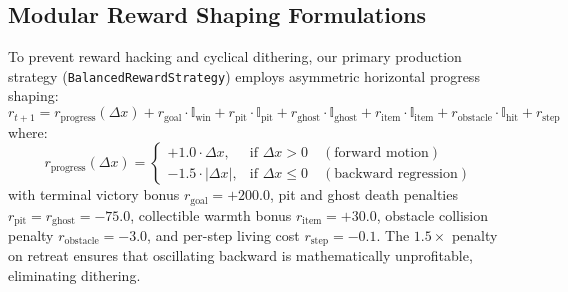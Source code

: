 \subsection{Modular Reward Shaping Formulations}
To prevent reward hacking and cyclical dithering, our primary production strategy (\texttt{BalancedRewardStrategy}) employs asymmetric horizontal progress shaping:
\begin{equation}
r_{t+1} = r_{\text{progress}}(\Delta x) + r_{\text{goal}} \cdot \mathbb{I}_{\text{win}} + r_{\text{pit}} \cdot \mathbb{I}_{\text{pit}} + r_{\text{ghost}} \cdot \mathbb{I}_{\text{ghost}} + r_{\text{item}} \cdot \mathbb{I}_{\text{item}} + r_{\text{obstacle}} \cdot \mathbb{I}_{\text{hit}} + r_{\text{step}}
\end{equation}
where:
\begin{equation}
r_{\text{progress}}(\Delta x) = \begin{cases}
+1.0 \cdot \Delta x, & \text{if } \Delta x > 0 \quad (\text{forward motion}) \\
-1.5 \cdot |\Delta x|, & \text{if } \Delta x \le 0 \quad (\text{backward regression})
\end{cases}
\end{equation}
with terminal victory bonus $r_{\text{goal}} = +200.0$, pit and ghost death penalties $r_{\text{pit}} = r_{\text{ghost}} = -75.0$, collectible warmth bonus $r_{\text{item}} = +30.0$, obstacle collision penalty $r_{\text{obstacle}} = -3.0$, and per-step living cost $r_{\text{step}} = -0.1$. The $1.5\times$ penalty on retreat ensures that oscillating backward is mathematically unprofitable, eliminating dithering.
